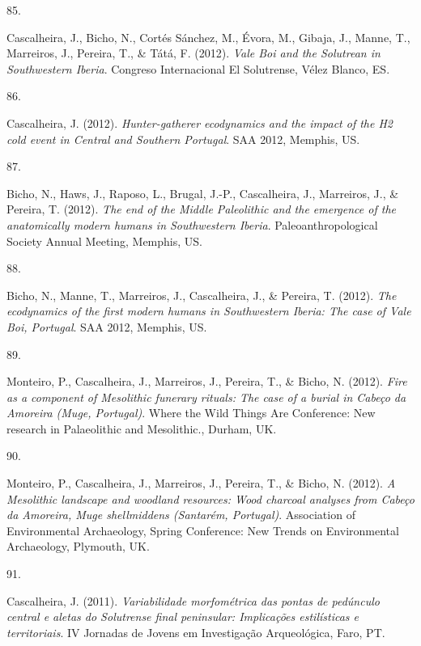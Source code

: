 \documentclass[11pt,a4paper,]{awesome-cv}
\newlength{\cslhangindent}
\newlength{\csllabelwidth}
\newenvironment{CSLReferences}[2] %
 {\begin{list}{}{%
  \setlength{\itemindent}{0pt}
  \setlength{\leftmargin}{0pt}
  \setlength{\parsep}{0pt}
  \ifodd #1
   \setlength{\leftmargin}{\cslhangindent}
   \setlength{\itemindent}{-1\cslhangindent}
  \fi
  \setlength{\itemsep}{#2\baselineskip}}}
 {\end{list}}
\newcommand{\CSLLeftMargin}[1]{\parbox[t]{\csllabelwidth}{\strut#1\strut}}
\newcommand{\CSLRightInline}[1]{\parbox[t]{\linewidth - \csllabelwidth}{\strut#1\strut}}
\begin{document}
\begin{CSLReferences}{0}{0}
\CSLLeftMargin{85. }%
\CSLRightInline{Cascalheira, J., Bicho, N., Cortés Sánchez, M., Évora,
M., Gibaja, J., Manne, T., Marreiros, J., Pereira, T., \& Tátá, F.
(2012). \emph{Vale Boi and the Solutrean in Southwestern Iberia}.
Congreso Internacional El Solutrense, Vélez Blanco, ES.}

\CSLLeftMargin{86. }%
\CSLRightInline{Cascalheira, J. (2012). \emph{Hunter-gatherer
ecodynamics and the impact of the H2 cold event in Central and Southern
Portugal}. SAA 2012, Memphis, US.}

\CSLLeftMargin{87. }%
\CSLRightInline{Bicho, N., Haws, J., Raposo, L., Brugal, J.-P.,
Cascalheira, J., Marreiros, J., \& Pereira, T. (2012). \emph{The end of
the Middle Paleolithic and the emergence of the anatomically modern
humans in Southwestern Iberia}. Paleoanthropological Society Annual
Meeting, Memphis, US.}

\CSLLeftMargin{88. }%
\CSLRightInline{Bicho, N., Manne, T., Marreiros, J., Cascalheira, J., \&
Pereira, T. (2012). \emph{The ecodynamics of the first modern humans in
Southwestern Iberia: The case of Vale Boi, Portugal}. SAA 2012, Memphis,
US.}

\CSLLeftMargin{89. }%
\CSLRightInline{Monteiro, P., Cascalheira, J., Marreiros, J., Pereira,
T., \& Bicho, N. (2012). \emph{Fire as a component of Mesolithic
funerary rituals: The case of a burial in Cabeço da Amoreira (Muge,
Portugal)}. Where the Wild Things Are Conference: New research in
Palaeolithic and Mesolithic., Durham, UK.}

\CSLLeftMargin{90. }%
\CSLRightInline{Monteiro, P., Cascalheira, J., Marreiros, J., Pereira,
T., \& Bicho, N. (2012). \emph{A Mesolithic landscape and woodland
resources: Wood charcoal analyses from Cabeço da Amoreira, Muge
shellmiddens (Santarém, Portugal)}. Association of Environmental
Archaeology, Spring Conference: New Trends on Environmental Archaeology,
Plymouth, UK.}

\CSLLeftMargin{91. }%
\CSLRightInline{Cascalheira, J. (2011). \emph{Variabilidade morfométrica
das pontas de pedúnculo central e aletas do Solutrense final peninsular:
Implicações estilísticas e territoriais}. IV Jornadas de Jovens em
Investigação Arqueológica, Faro, PT.}


\end{CSLReferences}
\end{document}
